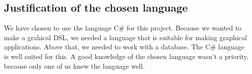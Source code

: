 \subsection{Justification of the chosen language}
We have chosen to use the language C\# for this project. Because we wanted to make a grahical DSL, we needed a language that is suitable for making graphical applications. Above that, we needed to work with a database. The C\# language is well suited for this. A good knowledge of the chosen language wasn't a priority, because only one of us knew the language well.